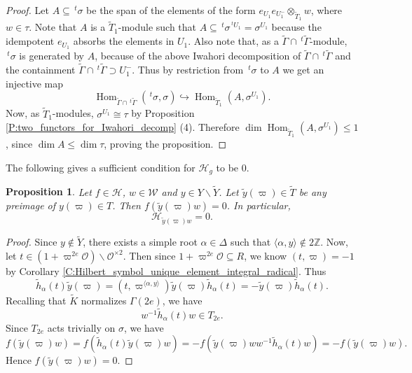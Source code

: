 \documentclass[10pt, letterpaper]{amsart}
\theoremstyle{plain}
\newtheorem{Prop}[equation]{Proposition}
\theoremstyle{definition}
\numberwithin{equation}{section}
\newcommand{\Z}{\mathbb{Z}}
\newcommand{\yt}{\tilde{y}}
\newcommand{\htt}{\tilde{h}}
\newcommand{\Kt}{\widetilde{K}}
\newcommand{\Tt}{\widetilde{T}}
\newcommand{\Yt}{\widetilde{Y}}
\newcommand{\Hom}{\operatorname{Hom}}
\newcommand{\Ocal}{\mathcal{O}}
\newcommand{\Wcal}{\mathcal{W}}
\newcommand{\Hcal}{\mathcal{H}}
\newcommand{\la}{\langle}
\newcommand{\ra}{\rangle}
\begin{document}
\begin{proof}
	Let $A\subseteq \,^{t}\sigma$ be the span of the elements of the form $e_{U_{1}}e_{U^{-}_{1}}\otimes_{\Tt_{1}} w$, where $w\in\tau$. Note that $A$ is a $\Tt_{1}$-module such that $A\subseteq \,^{t}\sigma^{\,^{t}U_{1}}=\sigma^{U_{1}}$ because the idempotent $e_{U_1}$ absorbs the elements in $U_1$. Also note that, as a $\widetilde{\Gamma}\cap\,^{t}\widetilde{\Gamma}$-module, $\,^{t}\sigma$ is generated by $A$, because of the above Iwahori decomposition of $\widetilde{\Gamma}\cap\,^{t}\widetilde{\Gamma}$ and the containment $\widetilde{\Gamma}\cap\,^{t}\widetilde{\Gamma}\supset U^{-}_{1}$. Thus by restriction from $\,^{t}\sigma$ to $A$ we get an injective map
	\begin{equation*}
		\Hom_{\widetilde{\Gamma}\cap\,^{t}\widetilde{\Gamma}}(\,^{t}\sigma,\sigma)\hookrightarrow\Hom_{\Tt_{1}}(A,\sigma^{U_{1}}).
	\end{equation*}
        Now, as $\Tt_{1}$-modules, $\sigma^{U_{1}}\cong \tau$ by Proposition \ref{P:two_functors_for_Iwahori_decomp} (4). Therefore $\dim\Hom_{\Tt_{1}}(A,\sigma^{U_{1}})\leq 1$, since $\dim A\leq \dim\tau$, proving the proposition.
\end{proof}

The following gives a sufficient condition for $\mathcal{H}_{g}$ to be $0$.

\begin{Prop}\label{HVanish}
	Let $f\in \Hcal$, $w\in \Wcal$ and $y\in Y\smallsetminus\Yt$. Let $\yt(\varpi)\in \Tt$ be any preimage of $y(\varpi)\in T$. Then $f(\yt(\varpi) w)=0$. In particular, 
	\begin{equation*}
		\Hcal_{\yt(\varpi) w}=0.
	\end{equation*}
\end{Prop}
\begin{proof}
	Since $y\notin\Yt$, there exists a simple root $\alpha\in\Delta$ such that $\la \alpha, y\ra\notin 2\Z$. Now, let $t\in (1+\varpi^{2e}\Ocal)\smallsetminus \Ocal^{\times 2}$. Then since $1+\varpi^{2e}\Ocal\subseteq R$, we know $(t, \varpi)=-1$ by Corollary \ref{C:Hilbert_symbol_unique_element_integral_radical}. Thus
	\[
	\htt_{\alpha}(t) \yt(\varpi)=(t, \varpi^{\la\alpha, y\ra})\yt(\varpi)\htt_{\alpha}(t)=-\yt(\varpi)\htt_{\alpha}(t).
	\]
	Recalling that $\Kt$ normalizes $\Gamma(2e)$, we have
	\[
	w^{-1}\htt_{\alpha}(t)w\in T_{2e}.
	\]
	Since $T_{2e}$ acts trivially on $\sigma$, we have
	\[
	f(\yt(\varpi) w)=f(\htt_{\alpha}(t)\yt(\varpi) w)=-f(\yt(\varpi)ww^{-1}\htt_{\alpha}(t)w)=-f(\yt(\varpi)w).
	\]
	Hence $f(\yt(\varpi) w)=0$.
\end{proof}
\end{document}
